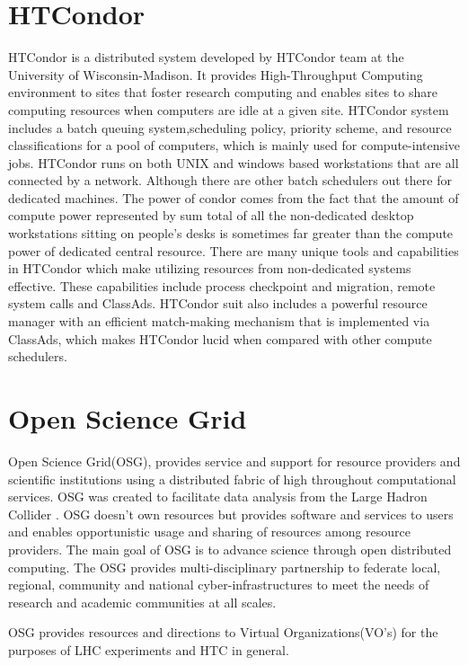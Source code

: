 \documentclass[ms,electronic,double]{nuthesis}
\begin{document}
\section{HTCondor} HTCondor is a distributed system developed by HTCondor team at the 
University of Wisconsin-Madison. It provides High-Throughput Computing environment to sites 
that foster research computing and enables sites to share computing resources when 
computers are idle at a given site. HTCondor system includes a batch queuing 
system,scheduling policy, priority scheme, and resource classifications for a pool of 
computers, which is mainly used for compute-intensive jobs. HTCondor runs on both
 UNIX and windows based workstations that are all connected by a network.  
Although there are other batch schedulers out there for dedicated machines. 
The power of condor comes from  the fact that  the amount of compute power 
represented by sum total of all the 
 non-dedicated desktop workstations sitting on people's desks is sometimes far 
 greater than the compute power of dedicated central resource. There are many 
 unique tools and capabilities in HTCondor which make utilizing resources from 
 non-dedicated systems effective. These capabilities include process checkpoint 
 and migration, remote system calls and ClassAds. HTCondor suit also includes a 
 powerful resource manager with an efficient match-making mechanism that is 
 implemented via ClassAds, which makes HTCondor lucid when compared with other 
 compute schedulers.
 
 
\section{Open Science Grid} Open Science Grid(OSG), provides service and support 
for resource providers and scientific institutions using a distributed fabric of 
high throughout computational services. OSG was created to facilitate data analysis from the 
Large Hadron Collider . OSG doesn't own resources but provides software and services to 
users and enables opportunistic usage and sharing of resources among resource providers.
The main goal of OSG is to advance science through open distributed computing. 
The OSG provides multi-disciplinary partnership to federate local, regional, community and 
national cyber-infrastructures to meet the needs of research and academic communities at all scales.

OSG provides resources and directions to Virtual Organizations(VO's) for the purposes of LHC experiments
and HTC in general. \\
\end{document}
